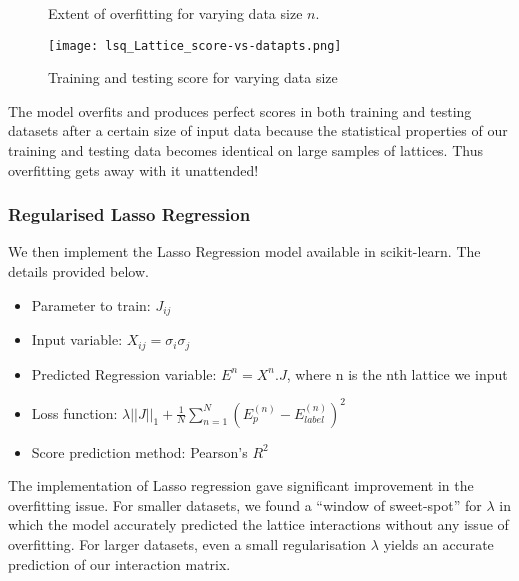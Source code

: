 \begin{figure}[h!]
\caption{Extent of overfitting for varying data size \( n \).}
\end{figure}


\begin{figure}[h!]
    \centering
    \texttt{[image: lsq\_Lattice\_score-vs-datapts.png]}
    \caption{Training and testing score for varying data size}
    \label{fig:lsqscore}
\end{figure}

The model overfits and produces perfect scores in both training and testing datasets after a certain size of input data because the statistical properties of our training and testing data becomes identical on large samples of lattices.
Thus overfitting gets away with it unattended!

\subsubsection{Regularised Lasso Regression}
We then implement the Lasso Regression model available in scikit-learn. The details provided below.
\begin{itemize}
    \item Parameter to train: \(J_{ij}\)
    \item Input variable: \(X_{ij}=\sigma_i\sigma_j\)
    \item Predicted Regression variable: \(E^n=X^n.J\), where n is the nth lattice we input
    \item Loss function: \(\lambda ||J||_1 + \frac{1}{N} \sum_{n=1}^N(E_p^{(n)}-E_{label}^{(n)})^2\)
    \item Score prediction method: Pearson's \(R^2\)
\end{itemize}

The implementation of Lasso regression gave significant improvement in the overfitting issue.
For smaller datasets, we found a ``window of sweet-spot'' for \(\lambda\) in which the model accurately predicted the lattice interactions without any issue of overfitting.
For larger datasets, even a small regularisation \(\lambda\) yields an accurate prediction of our interaction matrix.

